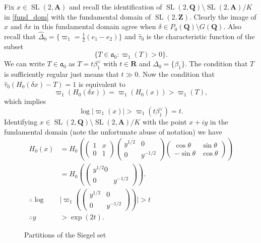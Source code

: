 \documentclass[11pt]{amsart}
\def\A{\mathbf A}
\def\Q{\mathbf Q}
\def\R{\mathbf R}
\def\Z{\mathbf Z}
\def\aaa{\mathfrak a}
\def\bs{\setminus}
\def\mod#1{\lvert #1 \rvert} %
\def\sl{\operatorname{SL}}
\theoremstyle{remark}
\begin{document}
Fix $x \in \sl(2, \A)$ and recall the identification of $\sl(2, \Q)\bs \sl(2, \A) / K$ in \cref{fund_dom} with the fundamental domain of $\sl(2, \Z)$. Clearly the image of $x$ and $\delta x$ in this fundamental domain agree when $\delta \in P_0(\Q) \bs G(\Q)$. 
Also recall that $\hat\Delta_0 = \{\varpi_1 = \frac{1}{2}(e_1 - e_2) \}$ and $\hat \tau_0$ is the characteristic function of the subset 
\[ \{ T \in \aaa_0 : \varpi_1(T) > 0 \}. \]
We can write $T \in \aaa_0$ as $T = t \beta_1^\vee$ with $t \in \R$ and $\Delta_0 = \{\beta_1\}$. The condition that $T$ is sufficiently regular just means that $t \gg 0$. Now the condition that $\hat\tau_0 (H_0(\delta x) - T) = 1$ is equivalent to 
\[ \varpi_1(H_0(\delta x)) = \varpi_1(H_0(x)) > \varpi_1(T), \]
which implies
\[ \log \mod{\varpi_1(x)} > \varpi_1(t \beta_1^\vee) = t. \]
Identifying $x \in \sl(2, \Q)\bs \sl(2, \A) / K$ with the point $x + iy$ in the fundamental domain (note the unfortunate abuse of notation) we have
\begin{equation} \label{x_decom}
	\begin{aligned} 
		H_0(x) & = H_0(\begin{pmatrix} 1 & x \\ 0 & 1 \end{pmatrix} \begin{pmatrix} y^{1/2} & 0 \\ 0 & y^{-1/2} \end{pmatrix} \begin{pmatrix} \cos \theta & \sin \theta \\ -\sin \theta & \cos \theta \end{pmatrix}) \\
			& = H_0(\begin{pmatrix} y^{1/2} 0 & \\ 0 & y^{-1/2} \end{pmatrix}). \\
	\therefore \log & \mod{\varpi_1(\begin{pmatrix} y^{1/2} & 0 \\ 0 & y^{-1/2} \end{pmatrix})} > t \\
	\therefore y & > \exp(2t).
	\end{aligned}
\end{equation}

\begin{figure} 
\centering
\caption{Partitions of the Siegel set} \label{fig:sd}
\end{figure}
\end{document}
